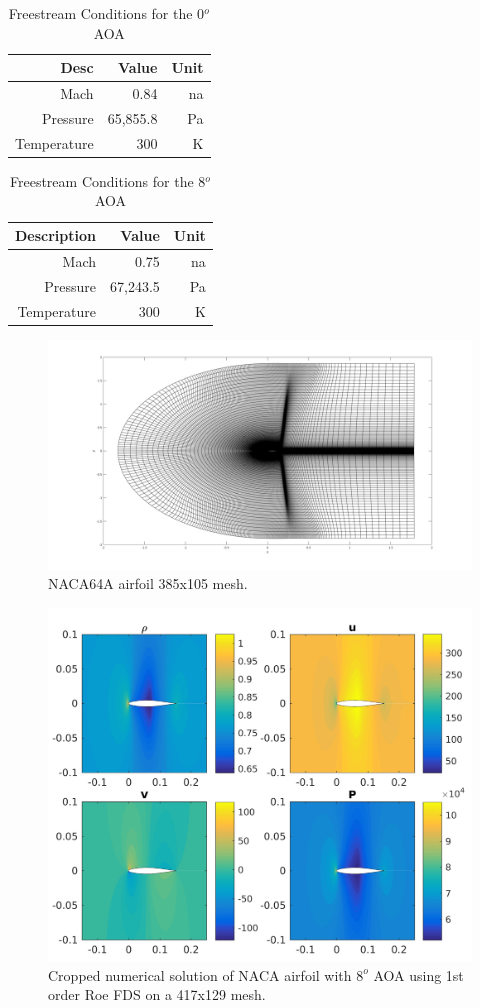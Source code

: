 \documentclass[]{aiaa-tc}%
\begin{document}
\begin{table}%
  \begin{center}
    \caption{Freestream Conditions for the 0$^o$ AOA}
    \label{tbl:0AOA}
    \begin{tabular}{rrr}
      Desc & Value & Unit \\\hline
      Mach &  0.84 & na \\
      Pressure &  65,855.8 & Pa \\
      Temperature & 300 & K
    \end{tabular}
  \end{center}
\end{table}
\begin{table}%
  \begin{center}
    \caption{Freestream Conditions for the 8$^o$ AOA}
    \label{tbl:8AOA}
    \begin{tabular}{rrr}
      Description & Value & Unit \\\hline
      Mach &  0.75 & na \\
      Pressure &  67,243.5 & Pa \\
      Temperature & 300 & K
    \end{tabular}
  \end{center}
\end{table}


\begin{figure}[!htb]
  \centering
  \includegraphics[width=0.5\linewidth]{figures/NACAMesh4}
  \caption{ NACA64A airfoil 385x105 mesh.}
  \label{fig:nacamesh}
\end{figure}

\begin{figure}[!htb]
  \centering
  \includegraphics[width=0.75\linewidth]{figures/NACA_mesh4_A0_Soln}
  \caption{Cropped numerical solution of NACA airfoil with $8^o$ AOA using 1st order Roe FDS on a 417x129 mesh.}
  \label{fig:naca0AO}
\end{figure}
\end{document}
